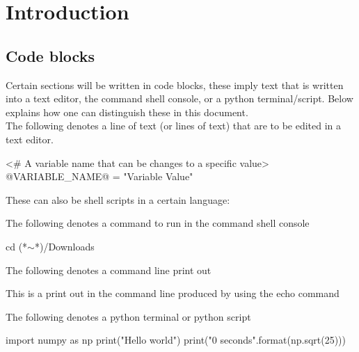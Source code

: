 \chapter{Introduction}
\label{chapter:intro}



\section{Code blocks}
\label{ch:intro:codeblocks}

Certain sections will be written in code blocks, these imply text that is written into a text editor, the command shell console, or a python terminal/script. Below explains how one can distinguish these in this document. \\

\noindent The following denotes a line of text (or lines of text) that are to be edited in a text editor.
\begin{textbox}
<# A variable name that can be changes to a specific value>
@VARIABLE_NAME@ = "Variable Value"
\end{textbox}

\noindent These can also be shell scripts in a certain language:

\noindent The following denotes a command to run in the command shell console 
\begin{cmdbox}
cd (*$\sim$*)/Downloads
\end{cmdbox}

\noindent The following denotes a command line print out
\begin{cmdboxprint}
 This is a print out in the command line
 produced by using the echo command
\end{cmdboxprint}

\noindent The following denotes a python terminal or python script
\begin{pythonbox}
import numpy as np
print("Hello world")
print("{0} seconds".format(np.sqrt(25)))
\end{pythonbox}
